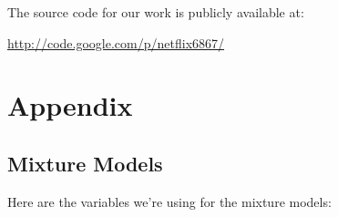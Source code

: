 \documentclass{article}
\begin{document}
The source code for our work is publicly available at:

\begin{center}
\url{http://code.google.com/p/netflix6867/}
\end{center}

\section{Appendix}

\subsection{Mixture Models}
\label{sec:appendix-mixture}

Here are the variables we're using for the mixture models:
\end{document}
